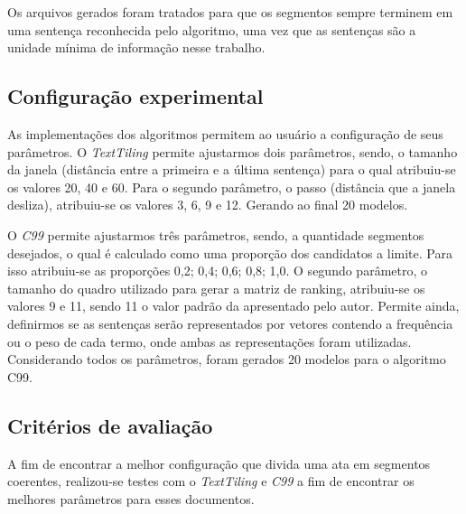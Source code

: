 Os arquivos gerados foram tratados para que os segmentos sempre terminem em uma sentença reconhecida pelo algoritmo, uma vez que as sentenças são a unidade mínima de informação nesse trabalho.
  

\subsection{Configuração experimental}
	\label{subsec:configuracaoexperimental}

As implementações dos algoritmos permitem ao usuário a configuração de seus parâmetros. 
%
O \textit{TextTiling} permite ajustarmos dois parâmetros, sendo, o tamanho da janela (distância entre a primeira e a última sentença) para o qual atribuiu-se os valores 20, 40 e 60. Para o segundo parâmetro, o passo (distância que a janela desliza), atribuiu-se os valores 3, 6, 9 e 12. Gerando ao final 20 modelos.
%

O \textit{C99} permite ajustarmos três parâmetros, sendo, a quantidade segmentos desejados, o qual é calculado como uma proporção dos candidatos a limite. Para isso atribuiu-se as proporções {0,2; 0,4; 0,6; 0,8; 1,0}. O segundo parâmetro, o tamanho do quadro utilizado para gerar a matriz de ranking, atribuiu-se os valores 9 e 11, sendo 11 o valor padrão da apresentado pelo autor. Permite ainda, definirmos se as sentenças serão representados por vetores contendo a frequência ou o peso de cada termo, onde ambas as representações foram utilizadas. Considerando todos os parâmetros, foram gerados 20 modelos para o algoritmo C99.

















\subsection{Critérios de avaliação}

A fim de encontrar a melhor configuração que divida uma ata em segmentos coerentes, realizou-se testes com o \textit{TextTiling} e \textit{C99} a fim de encontrar os melhores parâmetros para esses documentos.



